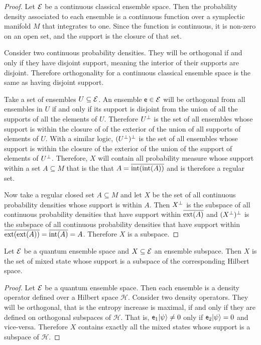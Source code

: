 \begin{proof}
	Let $\mathcal{E}$ be a continuous classical ensemble space. Then the probability density associated to each ensemble is a continuous function over a symplectic manifold $M$ that integrates to one. Since the function is continuous, it is non-zero on an open set, and the support is the closure of that set.
	
	Consider two continuous probability densities. They will be orthogonal if and only if they have disjoint support, meaning the interior of their supports are disjoint. Therefore orthogonality for a continuous classical ensemble space is the same as having disjoint support.
	
	Take a set of ensembles $U \subseteq \mathcal{E}$. An ensemble $\mathsf{e} \in \mathcal{E}$ will be orthogonal from all ensembles in $U$ if and only if its support is disjoint from the union of all the supports of all the elements of $U$. Therefore $U^\perp$ is the set of all ensembles whose support is within the closure of of the exterior of the union of all supports of elements of $U$. With a similar logic, $(U^\perp)^\perp$ is the set of all ensembles whose support is within the closure of the exterior of the union of the support of elements of $U^\perp$. Therefore, $X$ will contain all probability measure whose support within a set $A \subseteq M$ that is the that $A = \overline{\operatorname{int}(\operatorname{int}(A))}$ and is therefore a regular set.
	
	Now take a regular closed set $A \subseteq M$ and let $X$ be the set of all continuous probability densities whose support is within $A$. Then $X^\perp$ is the subspace of all continuous probability densities that have support within $\overline{\operatorname{ext}(A)}$ and $(X^\perp)^\perp$ is the subspace of all continuous probability densities that have support within $\overline{\operatorname{ext}(\operatorname{ext}(A))} = \overline{\operatorname{int}(A)} = A$. Therefore $X$ is a subspace.
\end{proof}

\begin{prop}
	Let $\mathcal{E}$ be a quantum ensemble space and $X \subseteq \mathcal{E}$ an ensemble subspace. Then $X$ is the set of mixed state whose support is a subspace of the corresponding Hilbert space.
\end{prop}

\begin{proof}
	Let $\mathcal{E}$ be a quantum ensemble space. Then each ensemble is a density operator defined over a Hilbert space $\mathcal{H}$. Consider two density operators. They will be orthogonal, that is the entropy increase is maximal, if and only if they are defined on orthogonal subspaces of $\mathcal{H}$. That is, $\mathsf{e}_1 | \psi \rangle \neq 0$ only if $\mathsf{e}_2 | \psi \rangle = 0$ and vice-versa. Therefore $X$ contains exactly all the mixed states whose support is a subspace of $\mathcal{H}$.
\end{proof}

